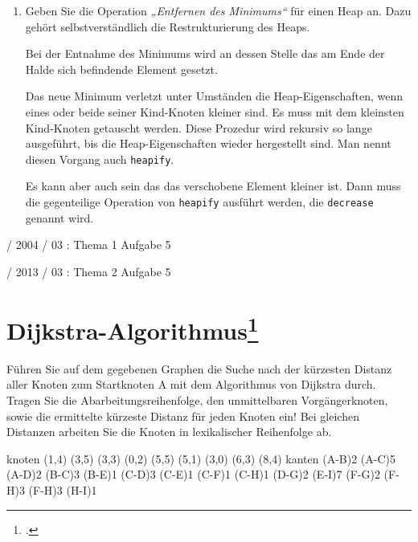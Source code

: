 \documentclass{lehramt-informatik-haupt}
\begin{document}
\begin{enumerate}

\item Geben Sie die Operation \emph{„Entfernen des Minimums“} für einen
Heap an. Dazu gehört selbstverständlich die Restrukturierung des Heaps.

\begin{antwort}
Bei der Entnahme des Minimums wird an dessen Stelle das am Ende
der Halde sich befindende Element gesetzt.

Das neue Minimum verletzt unter Umständen die Heap-Eigenschaften, wenn
eines oder beide seiner Kind-Knoten kleiner sind. Es muss mit dem
kleinsten Kind-Knoten getauscht werden. Diese Prozedur wird rekursiv so
lange ausgeführt, bis die Heap-Eigenschaften wieder hergestellt sind.
Man nennt diesen Vorgang auch \texttt{heapify}.

Es kann aber auch sein das das verschobene Element kleiner ist. Dann
muss die gegenteilige Operation von \texttt{heapify} ausführt werden,
die \texttt{decrease} genannt wird.
\end{antwort}
\end{enumerate}

%

 / 2004 / 03 : Thema 1 Aufgabe 5

%

 / 2013 / 03 : Thema 2 Aufgabe 5

%

\section{Dijkstra-Algorithmus\footcite[Aufgabe 4]{aud:e-klausur}}

Führen Sie auf dem gegebenen Graphen die Suche nach der kürzesten
Distanz aller Knoten zum Startknoten A mit dem Algorithmus von Dijkstra
durch. Tragen Sie die Abarbeitungsreihenfolge, den unmittelbaren
Vorgängerknoten, sowie die ermittelte kürzeste Distanz für jeden Knoten
ein! Bei gleichen Distanzen arbeiten Sie die Knoten in lexikalischer
Reihenfolge ab.

\graph knoten {
  (1,4)
  (3,5)
  (3,3)
  (0,2)
  (5,5)
  (5,1)
  (3,0)
  (6,3)
  (8,4)
} kanten {
  \kante(A-B){2}
  \kante(A-C){5}
  \kante(A-D){2}
  \kante(B-C){3}
  \kante(B-E){1}
  \kante(C-D){3}
  \kante(C-E){1}
  \kante(C-F){1}
  \kante(C-H){1}
  \kante(D-G){2}
  \kante(E-I){7}
  \kante(F-G){2}
  \kante(F-H){3}
  \kante(F-H){3}
  \kante(H-I){1}
}

\literatur
\end{document}
